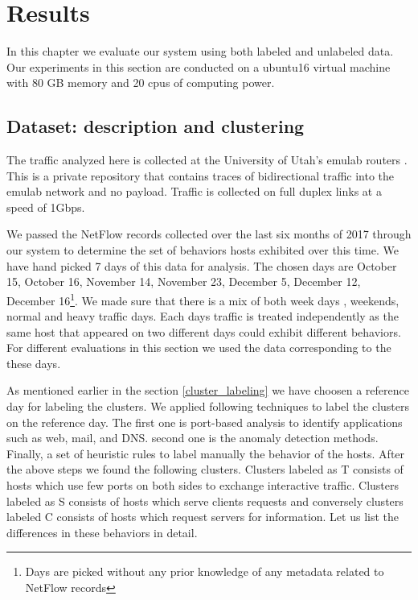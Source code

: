 
\chapter{Results}

In this chapter we evaluate our system using both labeled and unlabeled data. Our experiments in this section are conducted on a ubuntu16 virtual machine with 80 GB memory and 20 cpus of computing power. 

\section{Dataset: description and clustering}
The traffic analyzed here is collected at the University of Utah's emulab routers \cite{White+:osdi02}. This is a private repository that contains traces of bidirectional traffic into the emulab network and no payload. Traffic is collected on full duplex links at a speed of 1Gbps.

We passed the NetFlow records collected over the last six months of 2017 through our system to determine the set of behaviors hosts exhibited over this time. We have hand picked 7 days of this data for analysis. The chosen days are October 15, October 16, November 14, November 23, December 5, December 12, December 16\footnote{Days are picked without any prior knowledge of any metadata related to NetFlow records}. We made sure that there is a mix of both week days , weekends, normal and heavy traffic days. Each days traffic is treated independently as the same host that appeared on two different days could exhibit different behaviors. For different evaluations in this section we used the data corresponding to the these days.

As mentioned earlier in the section \ref{cluster_labeling} we have choosen a reference day for labeling the clusters. We applied following techniques to label the clusters on the reference day. The first one is port-based analysis to identify applications such as web, mail, and DNS. second one is the anomaly detection methods. Finally, a set of heuristic rules to label manually the behavior of the hosts. After the above steps we found the following clusters. Clusters labeled as T consists of hosts which use few ports on both sides to exchange interactive traffic. Clusters labeled as S consists of hosts which serve clients requests and conversely clusters labeled C consists of hosts which request servers for information. Let us list the differences in these behaviors in detail.

